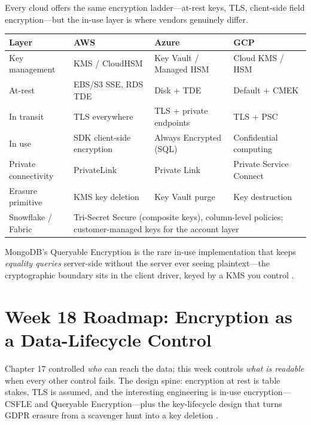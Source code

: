 \begin{crosscloud}
Every cloud offers the same encryption ladder---at-rest keys, TLS, client-side field encryption---but the in-use layer is where vendors genuinely differ.

\vspace{2mm}
{\footnotesize
\begin{tabular}{@{}p{2.9cm}p{3.0cm}p{3.0cm}p{3.0cm}@{}} 
\toprule
\textbf{Layer} & \textbf{AWS} & \textbf{Azure} & \textbf{GCP} \\
\midrule
Key management & KMS / CloudHSM & Key Vault / Managed HSM & Cloud KMS / HSM \\
At-rest & EBS/S3 SSE, RDS TDE & Disk + TDE & Default + CMEK \\
In transit & TLS everywhere & TLS + private endpoints & TLS + PSC \\
In use & SDK client-side encryption & Always Encrypted (SQL) & Confidential computing \\
Private connectivity & PrivateLink & Private Link & Private Service Connect \\
Erasure primitive & KMS key deletion & Key Vault purge & Key destruction \\
\addlinespace
Snowflake / Fabric & \multicolumn{3}{l}{Tri-Secret Secure (composite keys), column-level policies; customer-managed keys for the account layer} \\
\bottomrule
\end{tabular}}

\vspace{1mm}
MongoDB's Queryable Encryption is the rare in-use implementation that keeps \emph{equality queries} server-side without the server ever seeing plaintext---the cryptographic boundary sits in the client driver, keyed by a KMS you control \cite{mongodbQueryableEncryptionDocs,mongodbCSFLEDocs}.
\end{crosscloud}

\section{Week 18 Roadmap: Encryption as a Data-Lifecycle Control}
Chapter 17 controlled \emph{who} can reach the data; this week controls \emph{what is readable} when every other control fails. The design spine: encryption at rest is table stakes, TLS is assumed, and the interesting engineering is in-use encryption---CSFLE and Queryable Encryption---plus the key-lifecycle design that turns GDPR erasure from a scavenger hunt into a key deletion \cite{mongodbCSFLEDocs,mongodbQueryableEncryptionDocs}.

